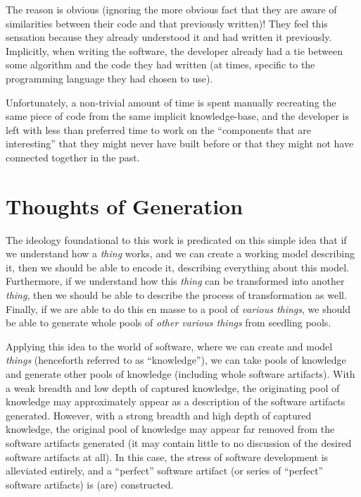 The reason is obvious (ignoring the more obvious fact that they are aware of
similarities between their code and that previously written)! They feel this
sensation because they already understood it and had written it previously.
Implicitly, when writing the software, the developer already had a tie between
some algorithm and the code they had written (at times, specific to the
programming language they had chosen to use).

Unfortunately, a non-trivial amount of time is spent manually recreating the
same piece of code from the same implicit knowledge-base, and the developer is
left with less than preferred time to work on the ``components that are
interesting'' that they might never have built before or that they might not
have connected together in the past.

\section{Thoughts of Generation}
\label{sec:idlgy:thoughts_of_generation}

The ideology foundational to this work is predicated on this simple idea that if
we understand how a \textit{thing} works, and we can create a working model
describing it, then we should be able to encode it, describing everything about
this model. Furthermore, if we understand how this \textit{thing} can be
transformed into another \textit{thing}, then we should be able to describe the
process of transformation as well. Finally, if we are able to do this en masse
to a pool of \textit{various things}, we should be able to generate whole pools
of \textit{other various things} from seedling pools.

Applying this idea to the world of software, where we can create and model
\textit{things} (henceforth referred to as ``knowledge''), we can take pools of
knowledge and generate other pools of knowledge (including whole software
artifacts). With a weak breadth and low depth of captured knowledge, the
originating pool of knowledge may approximately appear as a description of the
software artifacts generated. However, with a strong breadth and high depth of
captured knowledge, the original pool of knowledge may appear far removed from
the software artifacts generated (it may contain little to no discussion of the
desired software artifacts at all). In this case, the stress of software
development is alleviated entirely, and a ``perfect'' software artifact (or
series of ``perfect'' software artifacts) is (are) constructed.

